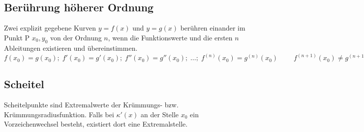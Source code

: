 \subsection{Berührung höherer Ordnung}
Zwei explizit gegebene Kurven $y = f(x)$ und $y = g(x)$ berühren einander im
Punkt P $x_0, y_0$ von der Ordnung $n$, wenn die Funktionswerte und die ersten
$n$ Ableitungen existieren und übereinstimmen.\\
$f(x_0) = g(x_0);\; f'(x_0) = g'(x_0);\; f''(x_0) = g''(x_0);\;\ldots ;
\;f^{(n)}(x_0) = g^{(n)}(x_0)\; \qquad f^{(n+1)}(x_0) \neq g^{(n+1)}(x_0)$

\subsection{Scheitel }
Scheitelpunkte sind Extremalwerte der Krümmungs- bzw. Krümmungsradiusfunktion.
Falls bei $\kappa'(x)$ an der Stelle $x_0$ ein Vorzeichenwechsel besteht, existiert dort
eine Extremalstelle. 

